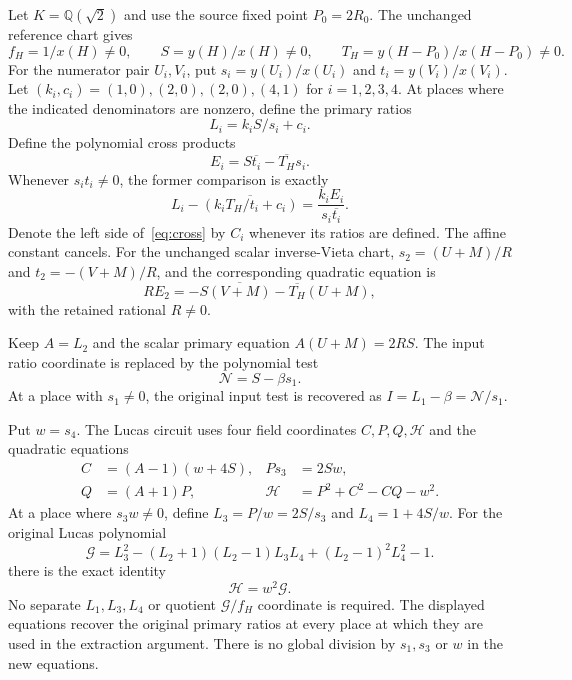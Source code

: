 \documentclass[11pt,a4paper]{article}
\newcommand{\Q}{\mathbb Q}\newcommand{\Z}{\mathbb Z}
\begin{document}
Let $K=\Q(\sqrt2)$ and use the source fixed point $P_0=2R_0$.
The unchanged reference chart gives
\[
 f_H=1/x(H)\ne0,\qquad S=y(H)/x(H)\ne0,\qquad
 T_H=y(H-P_0)/x(H-P_0)\ne0.
\]
For the numerator pair $U_i,V_i$, put
$s_i=y(U_i)/x(U_i)$ and $t_i=y(V_i)/x(V_i)$.
Let $(k_i,c_i)=(1,0),(2,0),(2,0),(4,1)$ for $i=1,2,3,4$.
At places where the indicated denominators are nonzero, define the
primary ratios
\[
 L_i=k_iS/s_i+c_i.
\]
Define the polynomial cross products
\[
                         E_i=S\overline{t_i}-\overline{T_H}s_i.
\]
Whenever $s_i t_i\ne0$, the former comparison is exactly
\begin{equation}\label{eq:cross}
 L_i-\overline{\left(k_iT_H/t_i+c_i\right)}
                      =\frac{k_iE_i}{s_i\overline{t_i}}.
\end{equation}
Denote the left side of~\eqref{eq:cross} by $C_i$ whenever its
ratios are defined.
The affine constant cancels. For the unchanged scalar inverse-Vieta
chart, $s_2=(U+M)/R$ and $t_2=-(V+M)/R$, and the corresponding
quadratic equation is
\[
 R E_2=-S\overline{(V+M)}-\overline{T_H}(U+M),
\]
with the retained rational $R\ne0$.

Keep $A=L_2$ and the scalar primary equation
$A(U+M)=2RS$. The input ratio coordinate is replaced by the polynomial test
\[
                         \mathcal N=S-\beta s_1.
\]
At a place with $s_1\ne0$, the original input test is recovered as
$I=L_1-\beta=\mathcal N/s_1$.

Put $w=s_4$. The Lucas circuit uses four field coordinates
$C,P,Q,\mathcal H$ and the quadratic equations
\begin{equation}\label{eq:homogeneous}
 \begin{aligned}
 C&=(A-1)(w+4S),& P s_3&=2S w,\\
 Q&=(A+1)P,& \mathcal H&=P^2+C^2-CQ-w^2.
 \end{aligned}
\end{equation}
At a place where $s_3w\ne0$, define
$L_3=P/w=2S/s_3$ and $L_4=1+4S/w$.
For the original Lucas polynomial
\[
 \mathcal G=L_3^2-(L_2+1)(L_2-1)L_3L_4+(L_2-1)^2L_4^2-1.
\]
there is the exact identity
\begin{equation}\label{eq:homogeneous-identity}
                         \mathcal H=w^2\mathcal G.
\end{equation}
No separate $L_1,L_3,L_4$ or quotient $\mathcal G/f_H$ coordinate
is required. The displayed equations recover the original primary
ratios at every place at which they are used in the extraction argument.
There is no global division by $s_1,s_3$ or $w$ in the new equations.
\end{document}

